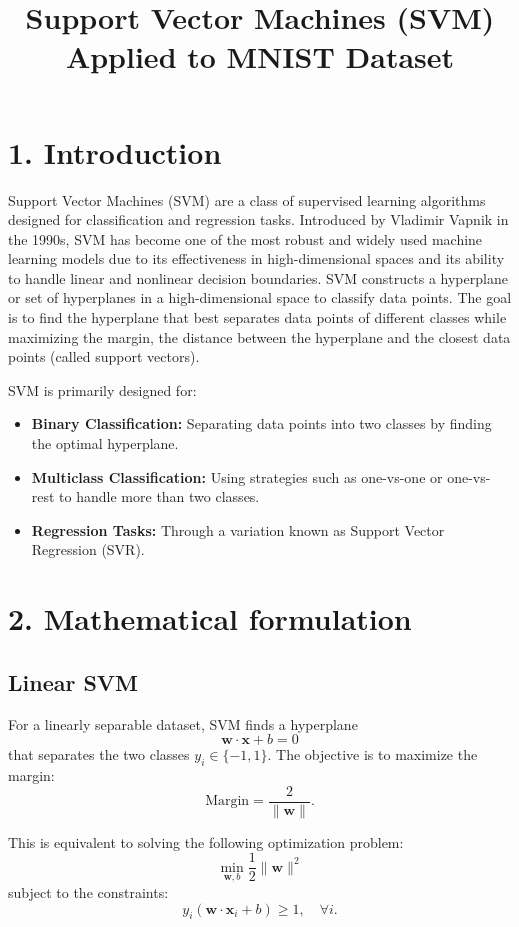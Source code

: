 \documentclass{article}
\title{\textbf{Support Vector Machines (SVM) Applied to MNIST Dataset}}
\date{}
\begin{document}
\author{}
\date{}
\maketitle

\section*{1. Introduction}

Support Vector Machines (SVM) are a class of supervised learning algorithms designed for classification and regression tasks. Introduced by Vladimir Vapnik in the 1990s, SVM has become one of the most robust and widely used machine learning models due to its effectiveness in high-dimensional spaces and its ability to handle linear and nonlinear decision boundaries. SVM constructs a hyperplane or set of hyperplanes in a high-dimensional space to classify data points. The goal is to find the hyperplane that best separates data points of different classes while maximizing the margin, the distance between the hyperplane and the closest data points (called support vectors).

\noindent
SVM is primarily designed for:
\begin{itemize}
    \item \textbf{Binary Classification:} Separating data points into two classes by finding the optimal hyperplane.
    \item \textbf{Multiclass Classification:} Using strategies such as one-vs-one or one-vs-rest to handle more than two classes.
    \item \textbf{Regression Tasks:} Through a variation known as Support Vector Regression (SVR).
\end{itemize}

\section*{2. Mathematical formulation}

\subsection*{Linear SVM}

For a linearly separable dataset, SVM finds a hyperplane
\[
\mathbf{w} \cdot \mathbf{x} + b = 0
\]
that separates the two classes \( y_i \in \{-1, 1\} \). The objective is to maximize the margin:
\[
\text{Margin} = \frac{2}{\|\mathbf{w}\|}.
\]

\noindent
This is equivalent to solving the following optimization problem:
\[
\min_{\mathbf{w}, b} \frac{1}{2} \|\mathbf{w}\|^2
\]
subject to the constraints:
\[
y_i (\mathbf{w} \cdot \mathbf{x}_i + b) \geq 1, \quad \forall i.
\]
\end{document}
